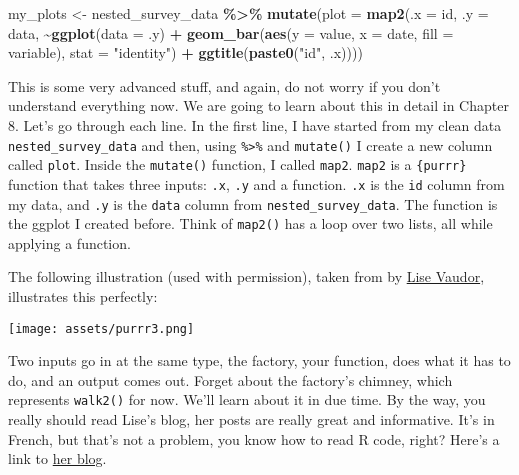\documentclass[
]{article}
\newenvironment{Shaded}{\begin{snugshade}}{\end{snugshade}}
\newcommand{\DataTypeTok}[1]{\textcolor[rgb]{0.13,0.29,0.53}{#1}}
\newcommand{\KeywordTok}[1]{\textcolor[rgb]{0.13,0.29,0.53}{\textbf{#1}}}
\newcommand{\NormalTok}[1]{#1}
\newcommand{\OperatorTok}[1]{\textcolor[rgb]{0.81,0.36,0.00}{\textbf{#1}}}
\newcommand{\StringTok}[1]{\textcolor[rgb]{0.31,0.60,0.02}{#1}}
\begin{document}
\begin{Shaded}
\begin{Highlighting}[]
\NormalTok{my\_plots \textless{}{-}}\StringTok{ }\NormalTok{nested\_survey\_data }\OperatorTok{\%\textgreater{}\%}
\StringTok{    }\KeywordTok{mutate}\NormalTok{(}\DataTypeTok{plot =} \KeywordTok{map2}\NormalTok{(}\DataTypeTok{.x =}\NormalTok{ id,}
                       \DataTypeTok{.y =}\NormalTok{ data,}
                       \OperatorTok{\textasciitilde{}}\KeywordTok{ggplot}\NormalTok{(}\DataTypeTok{data =}\NormalTok{ .y) }\OperatorTok{+}
\StringTok{                           }\KeywordTok{geom\_bar}\NormalTok{(}\KeywordTok{aes}\NormalTok{(}\DataTypeTok{y =}\NormalTok{ value, }\DataTypeTok{x =}\NormalTok{ date, }\DataTypeTok{fill =}\NormalTok{ variable), }\DataTypeTok{stat =} \StringTok{"identity"}\NormalTok{) }\OperatorTok{+}
\StringTok{                           }\KeywordTok{ggtitle}\NormalTok{(}\KeywordTok{paste0}\NormalTok{(}\StringTok{"id"}\NormalTok{, .x))))}
\end{Highlighting}
\end{Shaded}

This is some very advanced stuff, and again, do not worry if you don't understand everything now.
We are going to learn about this in detail in Chapter 8. Let's go through each line.
In the first line, I have started from my clean data \texttt{nested\_survey\_data} and then, using \texttt{\%\textgreater{}\%}
and \texttt{mutate()} I create a new column called \texttt{plot}. Inside the \texttt{mutate()} function, I called \texttt{map2}.
\texttt{map2} is a \texttt{\{purrr\}} function that takes three inputs: \texttt{.x}, \texttt{.y} and a function. \texttt{.x} is the \texttt{id}
column from my data, and \texttt{.y} is the \texttt{data} column from \texttt{nested\_survey\_data}. The function is the
ggplot I created before. Think of \texttt{map2()} has a loop over two lists, all while applying a function.

The following illustration (used with permission), taken from \citet{vaudor_purrr_2018} by
\href{https://twitter.com/LVaudor}{Lise Vaudor}, illustrates this perfectly:

\texttt{[image: assets/purrr3.png]}

Two inputs go in at the same type, the factory, your function, does what it has to do, and an
output comes out. Forget about the factory's chimney, which represents \texttt{walk2()} for now. We'll
learn about it in due time. By the way, you really should read Lise's blog, her posts are really
great and informative. It's in French, but that's not a problem, you know how to read R code, right?
Here's a link to \href{http://perso.ens-lyon.fr/lise.vaudor/}{her blog}.
\end{document}
